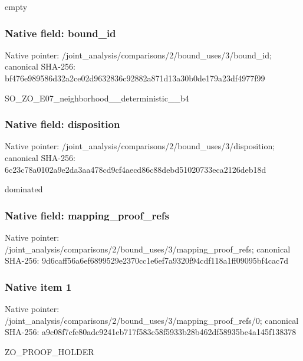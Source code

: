 \documentclass[10pt,a4paper]{article}
\begin{document}
\begingroup\raggedright\sloppy empty\par\endgroup

\subsubsection{Native field: bound\_\allowbreak{}id}
Native pointer: /joint\_\allowbreak{}analysis/comparisons/2/bound\_\allowbreak{}uses/3/bound\_\allowbreak{}id; canonical SHA-256: bf476e989586d32a2ce02d9632836c92882a871d13a30b0de179a23df4977f99

\begingroup\raggedright\sloppy SO\_\allowbreak{}ZO\_\allowbreak{}E07\_\allowbreak{}neighborhood\_\allowbreak{}\_\allowbreak{}deterministic\_\allowbreak{}\_\allowbreak{}b4\par\endgroup

\subsubsection{Native field: disposition}
Native pointer: /joint\_\allowbreak{}analysis/comparisons/2/bound\_\allowbreak{}uses/3/disposition; canonical SHA-256: 6c23c78a0102a9e2da3aa478cd9cf4aecd86c88debd51020733eca2126deb18d

\begingroup\raggedright\sloppy dominated\par\endgroup

\subsubsection{Native field: mapping\_\allowbreak{}proof\_\allowbreak{}refs}
Native pointer: /joint\_\allowbreak{}analysis/comparisons/2/bound\_\allowbreak{}uses/3/mapping\_\allowbreak{}proof\_\allowbreak{}refs; canonical SHA-256: 9d6caff56a6ef6899529e2370cc1e6ef7a9320f94cdf118a1ff09095bf4cac7d

\subsubsection{Native item 1}
Native pointer: /joint\_\allowbreak{}analysis/comparisons/2/bound\_\allowbreak{}uses/3/mapping\_\allowbreak{}proof\_\allowbreak{}refs/0; canonical SHA-256: a9c08f7cfe80adc9241eb717f583c58f5933b28b462df58935be4a145f138378

\begingroup\raggedright\sloppy ZO\_\allowbreak{}PROOF\_\allowbreak{}HOLDER\par\endgroup
\end{document}

